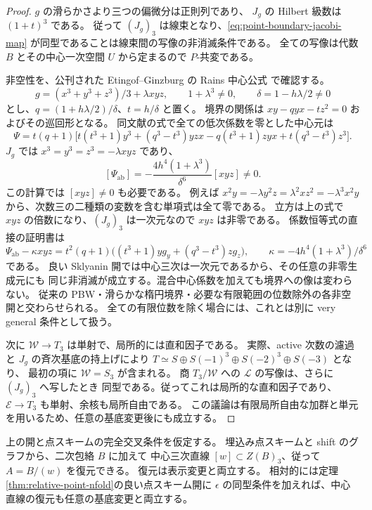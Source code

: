 \begin{proof}
$g$ の滑らかさより三つの偏微分は正則列であり、
$J_g$ の Hilbert 級数は $(1+t)^3$ である。
従って $(J_g)_3$ は線束となり、\eqref{eq:point-boundary-jacobi-map}
が同型であることは線束間の写像の非消滅条件である。
全ての写像は代数 $B$ とその中心一次空間 $U$ から定まるので $P$-共変である。

非空性を、公刊された Etingof--Ginzburg の Rains 中心公式
\cite[\S9, p.~1414]{NFMEG} で確認する。
\[
 g=(x^3+y^3+z^3)/3+\lambda xyz,\qquad 1+\lambda^3\ne0,
 \qquad \delta=1-h\lambda/2\ne0
\]
とし、$q=(1+h\lambda/2)/\delta$、$t=h/\delta$ と置く。
境界の関係は $xy-qyx-tz^2=0$ およびその巡回形となる。
同文献の式で全ての低次係数を零とした中心元は
\begin{equation}\label{eq:point-rains-homogeneous}
 \Psi=t(q+1)\bigl[
 t(t^3+1)y^3+(q^3-t^3)yzx-q(t^3+1)zyx+t(q^3-t^3)z^3
 \bigr].
\end{equation}
$J_g$ では $x^3=y^3=z^3=-\lambda xyz$ であり、
\begin{equation}\label{eq:point-rains-socle}
 [\Psi_{\mathrm{ab}}]
 =-\frac{4h^4(1+\lambda^3)}{\delta^6}[xyz]\ne0.
\end{equation}
この計算では $[xyz]\ne0$ も必要である。
例えば $x^2y=-\lambda y^2z=\lambda^2xz^2=-\lambda^3x^2y$
から、次数三の二種類の変数を含む単項式は全て零である。
立方は上の式で $xyz$ の倍数になり、$(J_g)_3$ は一次元なので $xyz$ は非零である。
係数恒等式の直接の証明書は
\[
 \Psi_{\mathrm{ab}}-\kappa xyz
 =t^2(q+1)\bigl((t^3+1)y g_y+(q^3-t^3)z g_z\bigr),\qquad
 \kappa=-4h^4(1+\lambda^3)/\delta^6
\]
である。
良い Sklyanin 開では中心三次は一次元であるから、その任意の非零生成元にも
同じ非消滅が成立する。混合中心係数を加えても境界への像は変わらない。
従来の PBW・滑らかな楕円境界・必要な有限範囲の位数除外の各非空開と交わらせられる。
全ての有限位数を除く場合には、これとは別に very general 条件として扱う。

次に $\mathcal W\to T_3$ は単射で、局所的には直和因子である。
実際、active 次数の濾過と $J_g$ の斉次基底の持上げにより
$T\simeq S\oplus S(-1)^3\oplus S(-2)^3\oplus S(-3)$ となり、
最初の項に $\mathcal W=S_3$ が含まれる。
商 $T_3/\mathcal W$ への $\mathcal L$ の写像は、さらに $(J_g)_3$ へ写したとき
同型である。従ってこれは局所的な直和因子であり、
$\mathcal E\to T_3$ も単射、余核も局所自由である。
この議論は有限局所自由な加群と単元を用いるため、任意の基底変更後にも成立する。
\end{proof}

\begin{theorem}[点対応から中心商までの復元]\label{thm:point-central-recovery}
上の開と点スキームの完全交叉条件を仮定する。
埋込み点スキームと shift のグラフから、二次包絡 $B$ に加えて
中心三次直線 $[w]\subset Z(B)_3$、従って $A=B/(w)$ を復元できる。
復元は表示変更と両立する。
相対的には定理\ref{thm:relative-point-nfold}の良い点スキーム開に
$\epsilon$ の同型条件を加えれば、中心直線の復元も任意の基底変更と両立する。
\end{theorem}

